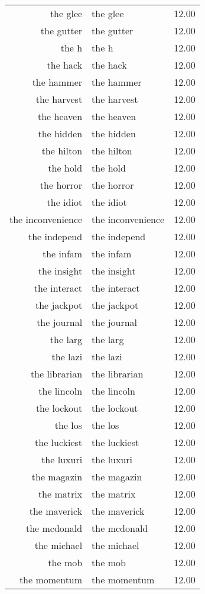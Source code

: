 \begin{table}[ht]
\begin{tabular}{rlr}
  the glee & the glee & 12.00 \\ 
  the gutter & the gutter & 12.00 \\ 
  the h & the h & 12.00 \\ 
  the hack & the hack & 12.00 \\ 
  the hammer & the hammer & 12.00 \\ 
  the harvest & the harvest & 12.00 \\ 
  the heaven & the heaven & 12.00 \\ 
  the hidden & the hidden & 12.00 \\ 
  the hilton & the hilton & 12.00 \\ 
  the hold & the hold & 12.00 \\ 
  the horror & the horror & 12.00 \\ 
  the idiot & the idiot & 12.00 \\ 
  the inconvenience & the inconvenience & 12.00 \\ 
  the independ & the independ & 12.00 \\ 
  the infam & the infam & 12.00 \\ 
  the insight & the insight & 12.00 \\ 
  the interact & the interact & 12.00 \\ 
  the jackpot & the jackpot & 12.00 \\ 
  the journal & the journal & 12.00 \\ 
  the larg & the larg & 12.00 \\ 
  the lazi & the lazi & 12.00 \\ 
  the librarian & the librarian & 12.00 \\ 
  the lincoln & the lincoln & 12.00 \\ 
  the lockout & the lockout & 12.00 \\ 
  the los & the los & 12.00 \\ 
  the luckiest & the luckiest & 12.00 \\ 
  the luxuri & the luxuri & 12.00 \\ 
  the magazin & the magazin & 12.00 \\ 
  the matrix & the matrix & 12.00 \\ 
  the maverick & the maverick & 12.00 \\ 
  the mcdonald & the mcdonald & 12.00 \\ 
  the michael & the michael & 12.00 \\ 
  the mob & the mob & 12.00 \\ 
  the momentum & the momentum & 12.00 \\ 

\end{tabular}
\end{table}
